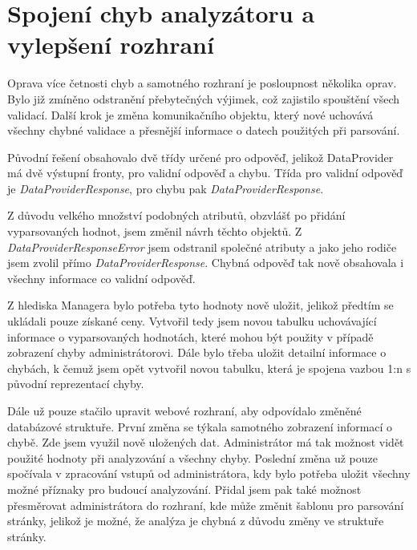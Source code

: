 \documentclass[thesis=B,czech]{FITthesis}[2012/06/26]
\begin{document}
\section{Spojení chyb analyzátoru a vylepšení rozhraní}
Oprava více četnosti chyb a samotného rozhraní je posloupnost několika oprav. 
Bylo již zmíněno odstranění přebytečných výjimek, což zajistilo spouštění všech validací. 
Další krok je změna komunikačního objektu, který nové uchovává všechny chybné validace a přesnější informace
o datech použitých při parsování.
\par
Původní řešení obsahovalo dvě třídy určené pro odpověď, jelikož DataProvider má dvě výstupní fronty, pro validní odpověď a chybu. 
Třída pro validní odpověď je \textit{DataProviderResponse}, pro chybu pak \textit{DataProviderResponse}.
\par
Z důvodu velkého množství podobných atributů, obzvlášť po přidání vyparsovaných hodnot, jsem změnil návrh těchto objektů.
Z \textit{DataProviderResponseError} jsem odstranil společné atributy a jako jeho rodiče jsem zvolil přímo \textit{DataProviderResponse}.
Chybná odpověď tak nově obsahovala i všechny informace co validní odpověď. 
\par
Z hlediska Managera bylo potřeba tyto hodnoty nově uložit, jelikož předtím se ukládali pouze získané ceny. Vytvořil tedy jsem novou tabulku
uchovávající informace o vyparsovaných hodnotách, které mohou být použity v případě zobrazení chyby administrátorovi.
Dále bylo třeba uložit detailní informace o chybách, k čemuž jsem opět vytvořil novou tabulku, která je spojena vazbou 1:n s původní
reprezentací chyby.
\par
Dále už pouze stačilo upravit webové rozhraní, aby odpovídalo změněné databázové struktuře. První změna se týkala samotného zobrazení
informací o chybě. Zde jsem využil nově uložených dat. Administrátor má tak možnost vidět použité hodnoty při analyzování a všechny chyby.
Poslední změna už pouze spočívala v zpracování vstupů od administrátora, kdy bylo potřeba uložit všechny možné příznaky pro 
budoucí analyzování. Přidal jsem pak také možnost přesměrovat administrátora do rozhraní, kde může změnit šablonu pro parsování
stránky, jelikož je možné, že analýza je chybná z důvodu změny ve struktuře stránky.

\newpage
\end{document}
